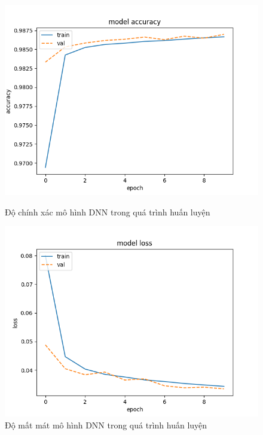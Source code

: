 \begin{figure}[!htb]
	\begin{minipage}{0.48\textwidth}
		\centering
		\includegraphics[width=\linewidth]{fig/dnn-train-acc.png}
		\caption{Độ chính xác mô hình DNN trong quá trình huấn luyện}
		\label{fig:dnn-train-acc}
	\end{minipage}\hfill
	\begin{minipage}{0.48\textwidth}
		\centering
		\includegraphics[width=\linewidth]{fig/dnn-train-loss.png}
		\caption{Độ mất mát mô hình DNN trong quá trình huấn luyện}
		\label{fig:dnn-train-loss}
	\end{minipage}
\end{figure}

